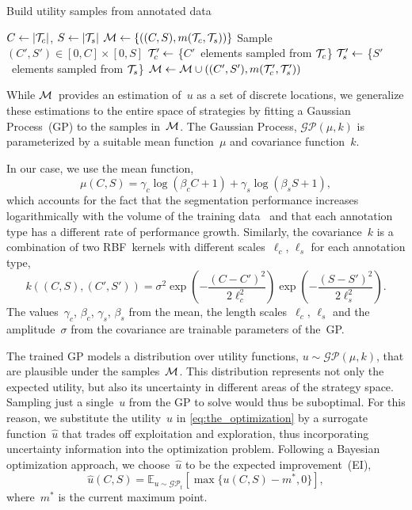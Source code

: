 \begin{algorithm}[t!] 
\caption{Build utility samples from annotated data}
\label{alg:build_gp_samples}
\begin{algorithmic}[1]
    \State $C \leftarrow |\mathcal{T}_c|$, $S \leftarrow |\mathcal{T}_s|$
    \State $\mathcal{M} \leftarrow \{((C, S), m(\mathcal{T}_c,\mathcal{T}_s))\}$ 
    \State Sample $(C', S')\in[0, C]\times[0, S]$
    \State $\mathcal{T}'_c \leftarrow$ \{$C'$~elements sampled from $\mathcal{T}_c$\}
    \State $\mathcal{T}'_s \leftarrow$ \{$S'$~elements sampled from $\mathcal{T}_s$\}
    \State $\mathcal{M} \leftarrow \mathcal{M} \cup ((C', S'), m(\mathcal{T}'_c, \mathcal{T}'_s))$ 
    \EndRepeat
    \EndFunction
\end{algorithmic}
\end{algorithm}

While $\mathcal{M}$~provides an estimation of~$u$ as a set of discrete locations, we generalize these estimations to the entire space of strategies by fitting a Gaussian Process~(GP) to the samples in~$\mathcal{M}$. The Gaussian Process, $\mathcal{GP}(\mu, k)$ is parameterized by a suitable mean function~$\mu$ and covariance function~$k$. 

In our case, we use the mean function,
\begin{equation}
    \mu(C, S) = \gamma_c\log(\beta_cC+1) + \gamma_s\log(\beta_sS+1),
    \label{eq:gp_mean}
\end{equation}
which accounts for the fact that the segmentation performance increases logarithmically with the volume of the training data~ and that each annotation type has a different rate of performance growth. Similarly, the covariance~$k$ is a combination of two RBF~kernels with different scales~$\ell_c$, $\ell_s$ for each annotation type,
\begin{equation}
    k\left((C, S), (C', S')\right) = \sigma^2\exp\left(-\frac{(C-C')^2}{2\ell_c^2}\right) \exp\left(-\frac{(S-S')^2}{2\ell_s^2}\right).
\end{equation}
The values~$\gamma_c$, $\beta_c$, $\gamma_s$, $\beta_s$ from the mean, the length scales~$\ell_c$, $\ell_s$ and the amplitude~$\sigma$ from the covariance are trainable parameters of the~GP.


The trained GP models a distribution over utility functions, $u \sim\mathcal{GP}(\mu, k)$, that are plausible under the samples~$\mathcal{M}$. This distribution represents not only the expected utility, but also its uncertainty in different areas of the strategy space. Sampling just a single~$u$ from the GP to solve  would thus be suboptimal. For this reason, we substitute the utility~$u$ in \cref{eq:the_optimization} by a surrogate function~$\hat{u}$ that trades off exploitation and exploration, thus incorporating uncertainty information into the optimization problem. Following a Bayesian optimization approach, we choose~$\hat{u}$ to be the expected improvement~(EI),
\begin{equation}
    \hat{u}(C, S) = \mathbb{E}_{u\sim\mathcal{GP}_t}[\max\{u(C, S) - m^*, 0\}],
    \label{eq:EI}
\end{equation}
where~$m^*$ is the current maximum point.


